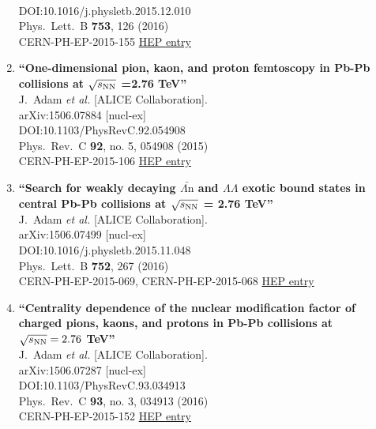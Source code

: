 \begin{enumerate}
  \\{}DOI:10.1016/j.physletb.2015.12.010
  \\{}Phys.\ Lett.\ B {\bf 753}, 126 (2016)
  \\{}CERN-PH-EP-2015-155
\href{http://inspirehep.net/record/1379977}{HEP entry}
\item%
{\bf ``One-dimensional pion, kaon, and proton femtoscopy in Pb-Pb collisions at $\sqrt{s_{\rm {NN}}}$ =2.76 TeV''}
  \\{}J.~Adam {\it et al.} [ALICE Collaboration].
  \\{}arXiv:1506.07884 [nucl-ex]
  \\{}DOI:10.1103/PhysRevC.92.054908
  \\{}Phys.\ Rev.\ C {\bf 92}, no. 5, 054908 (2015)
  \\{}CERN-PH-EP-2015-106
\href{http://inspirehep.net/record/1379971}{HEP entry}
\item%
{\bf ``Search for weakly decaying $\bar{\Lambda\mathrm{n}}$ and $\Lambda\Lambda $ exotic bound states in central Pb-Pb collisions at $\sqrt{s_{\rm NN}}$ = 2.76 TeV''}
  \\{}J.~Adam {\it et al.} [ALICE Collaboration].
  \\{}arXiv:1506.07499 [nucl-ex]
  \\{}DOI:10.1016/j.physletb.2015.11.048
  \\{}Phys.\ Lett.\ B {\bf 752}, 267 (2016)
  \\{}CERN-PH-EP-2015-069, CERN-PH-EP-2015-068
\href{http://inspirehep.net/record/1377753}{HEP entry}
\item%
{\bf ``Centrality dependence of the nuclear modification factor of charged pions, kaons, and protons in Pb-Pb collisions at $\sqrt{s_{\rm NN}}=2.76$ TeV''}
  \\{}J.~Adam {\it et al.} [ALICE Collaboration].
  \\{}arXiv:1506.07287 [nucl-ex]
  \\{}DOI:10.1103/PhysRevC.93.034913
  \\{}Phys.\ Rev.\ C {\bf 93}, no. 3, 034913 (2016)
  \\{}CERN-PH-EP-2015-152
\href{http://inspirehep.net/record/1377750}{HEP entry}

\end{enumerate}
